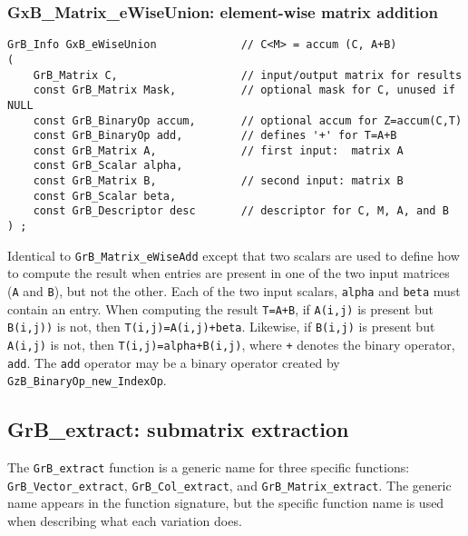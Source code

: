 \documentclass[12pt]{article}
\begin{document}
\newpage
\subsubsection{{\sf GxB\_Matrix\_eWiseUnion:} element-wise matrix addition}
\label{eWiseUnion_matrix}

\begin{mdframed}[userdefinedwidth=6in]
{\footnotesize
\begin{verbatim}
GrB_Info GxB_eWiseUnion             // C<M> = accum (C, A+B)
(
    GrB_Matrix C,                   // input/output matrix for results
    const GrB_Matrix Mask,          // optional mask for C, unused if NULL
    const GrB_BinaryOp accum,       // optional accum for Z=accum(C,T)
    const GrB_BinaryOp add,         // defines '+' for T=A+B
    const GrB_Matrix A,             // first input:  matrix A
    const GrB_Scalar alpha,
    const GrB_Matrix B,             // second input: matrix B
    const GrB_Scalar beta,
    const GrB_Descriptor desc       // descriptor for C, M, A, and B
) ;
\end{verbatim} } \end{mdframed}

Identical to \verb'GrB_Matrix_eWiseAdd' except that two scalars are used
to define how to compute the result when entries are present in one of
the two input matrices (\verb'A' and \verb'B'), but not the other.
Each of the two input scalars, \verb'alpha' and \verb'beta'
must contain an entry.
When computing the result \verb'T=A+B',
if \verb'A(i,j)' is present but \verb'B(i,j))' is not, then \verb'T(i,j)=A(i,j)+beta'.
Likewise,
if \verb'B(i,j)' is present but \verb'A(i,j)' is not, then \verb'T(i,j)=alpha+B(i,j)',
where \verb'+' denotes the binary operator, \verb'add'.
%
The \verb'add' operator may be a binary operator
created by \verb'GzB_BinaryOp_new_IndexOp'.

\newpage
\subsection{{\sf GrB\_extract:} submatrix extraction } %
\label{extract}

The \verb'GrB_extract' function is a generic name for three specific functions:
\verb'GrB_Vector_extract', \verb'GrB_Col_extract', and
\verb'GrB_Matrix_extract'.  The generic name appears in the function signature,
but the specific function name is used when describing what each variation
does.
\end{document}
